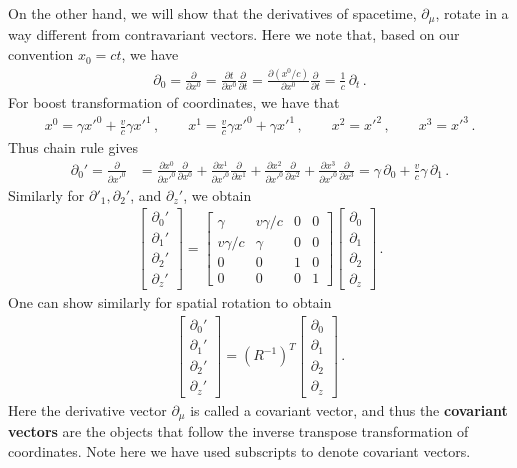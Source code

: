 \documentclass[11pt, onesided]{book}
\theoremstyle{break}
\theoremstyle{break}
\newcommand{\pd}{\partial}
\newcommand{\bmat}[1]{\begin{bmatrix} #1 \end{bmatrix}}
\begin{document}
On the other hand, we will show that the derivatives of spacetime, $\pd_\mu$, rotate in a way different from contravariant vectors. Here we note that, based on our convention $x_0 = ct$, we have
\begin{align*}
\pd_0 = \frac{\pd}{\pd x^0} = \frac{\pd t}{\pd x^0} \frac{\pd}{\pd t} = \frac{\pd (x^0/c)}{\pd x^0} \frac{\pd}{\pd t} = \frac{1}{c}\, \pd_t\,.
\end{align*}
For boost transformation of coordinates, we have that
\begin{align*}
x^0 = \gamma x'^0 + \frac{v}{c}\gamma x'^1\,,\qquad 
x^1 = \frac{v}{c}\gamma x'^0 + \gamma x'^1\,,\qquad
x^2 = x'^2 \,,\qquad
x^3 = x'^3\,.
\end{align*}
Thus chain rule gives
\begin{align*}
\pd_0' = \frac{\pd}{\pd x'^0} 
&= \frac{\pd x^0}{\pd x'^0} \frac{\pd}{\pd x^0}
+\frac{\pd x^1}{\pd x'^0} \frac{\pd}{\pd x^1}
+\frac{\pd x^2}{\pd x'^0} \frac{\pd}{\pd x^2}
+\frac{\pd x^3}{\pd x'^0} \frac{\pd}{\pd x^3}=\gamma\,\pd_0 + \frac{v}{c}\gamma \, \pd_1 \,.
\end{align*}
Similarly for $\pd'_1, \pd_2'$, and $\pd_z'$, we obtain
\begin{align*}
\bmat{\pd_0'\\
\pd_1'\\
\pd_2'\\
\pd_z'} = 
\bmat{\gamma & v\gamma/c & 0 & 0\\
v\gamma/c & \gamma &0 &0\\
0 &0 &1 &0\\
0 & 0&0 & 1}
\bmat{\pd_0\\
\pd_1\\
\pd_2\\
\pd_z}\,.
\end{align*}
One can show similarly for spatial rotation to obtain
\begin{align*}
\bmat{\pd_0'\\
\pd_1'\\
\pd_2'\\
\pd_z'} = 
(R^{-1})^T 
\bmat{\pd_0\\
\pd_1\\
\pd_2\\
\pd_z}\,.
\end{align*}
Here the derivative vector $\pd_\mu$ is called a covariant vector, and thus the \textbf{covariant vectors} are the objects that follow the inverse transpose transformation of coordinates. Note here we have used subscripts to denote covariant vectors.\\
\end{document}

